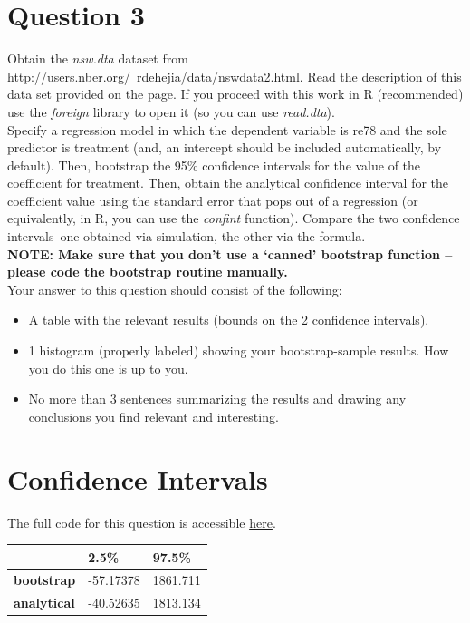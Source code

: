 \documentclass[11pt, oneside]{article}
\begin{document}
\section*{Question 3}
Obtain the \textit{nsw.dta} dataset from http://users.nber.org/~rdehejia/data/nswdata2.html. Read the description of this data set provided on the page. If you proceed with this work in R (recommended) use the \textit{foreign} library to open it (so you can use \textit{read.dta}). \\ 

Specify a regression model in which the dependent variable is re78 and the sole predictor is treatment (and, an intercept should be included automatically, by default). Then, bootstrap the 95\% confidence intervals for the value of the coefficient for treatment. Then, obtain the analytical confidence interval for the coefficient value using the standard error that pops out of a regression (or equivalently, in R, you can use the \textit{confint} function). Compare the two confidence intervals--one obtained via simulation, the other via the formula.\\

\textbf{NOTE: Make sure that you don't use a `canned' bootstrap function -- please code the bootstrap routine manually.}\\

Your answer to this question should consist of the following:
\begin{itemize}
\item A table with the relevant results (bounds on the 2 confidence intervals).
\item 1 histogram (properly labeled) showing your bootstrap-sample results. How you do this one is up to you.
\item No more than 3 sentences summarizing the results and drawing any conclusions you find relevant and interesting.
\end{itemize}

\section*{Confidence Intervals}
The full code for this question is accessible  \href{https://github.com/thetruejacob/CS112/blob/master/Assignment/Assignment 2.ipynb}{here}.
\begin{table}[h]
\begin{tabular}{l|l|l|}
\cline{2-3}
                                          & \textbf{2.5\%} & \textbf{97.5\%} \\ \hline
\multicolumn{1}{|l|}{\textbf{bootstrap}}  & -57.17378      & 1861.711        \\ \hline
\multicolumn{1}{|l|}{\textbf{analytical}} & -40.52635      & 1813.134        \\ \hline
\end{tabular}
\end{table}
\newpage
\end{document}
